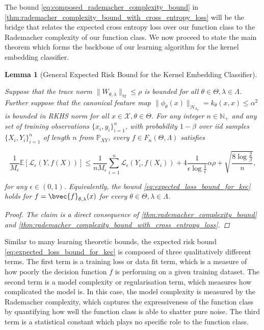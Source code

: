 \documentclass{article}
\newtheorem{lemma}[theorem]{Lemma}
\begin{document}
		The bound \eqref{eq:composed_rademacher_complexity_bound} in \cref{thm:rademacher_complexity_bound_with_cross_entropy_loss} will be the bridge that relates the expected cross entropy loss over our function class to the Rademacher complexity of our function class. We now proceed to state the main theorem which forms the backbone of our learning algorithm for the kernel embedding classifier.
		
		\begin{lemma}[General Expected Risk Bound for the Kernel Embedding Classifier]
			\label{thm:expected_loss_bound_for_kec}
			
			Suppose that the trace norm $\| W_{\theta, \lambda} \|_{\mathrm{tr}} \leq \rho$ is bounded for all $\theta \in \Theta, \lambda \in \Lambda$. Further suppose that the canonical feature map $\| \phi_{\theta}(x) \|_{\mathcal{H}_{k_{\theta}}} = k_{\theta}(x, x) \leq \alpha^{2}$ is bounded in RKHS norm for all $x \in \mathcal{X}, \theta \in \Theta$. For any integer $n \in \mathbb{N}_{+}$ and any set of training observations $\{x_{i}, y_{i}\}_{i = 1}^{n}$, with probability $1 - \beta$ over \textit{iid} samples $\{X_{i}, Y_{i}\}_{i = 1}^{n}$ of length $n$ from $\mathbb{P}_{X Y}$, every $f \in F_{n}(\Theta, \Lambda)$ satisfies
			
			\begin{equation}
				\frac{1}{M_{\epsilon}} \mathbb{E}[\mathcal{L}_{\epsilon}(Y, f(X))] \leq \frac{1}{n M_{\epsilon}} \sum_{i = 1}^{n} \mathcal{L}_{\epsilon}(Y_{i}, f(X_{i})) + 4 \frac{1}{\epsilon \log{\frac{1}{\epsilon}}} \alpha \rho + \sqrt{\frac{8 \log{\frac{2}{\beta}}}{n}},
			\label{eq:expected_loss_bound_for_kec}
			\end{equation}
			
			for any $\epsilon \in (0, 1)$. Equivalently, the bound \eqref{eq:expected_loss_bound_for_kec} holds for $f = \bvec{f}_{\theta, \lambda}(x)$ for every $\theta \in \Theta, \lambda \in \Lambda$.
	
			\begin{proof}
				The claim is a direct consequence of \cref{thm:rademacher_complexity_bound} and \cref{thm:rademacher_complexity_bound_with_cross_entropy_loss}.
			\end{proof}
		\end{lemma}

		Similar to many learning theoretic bounds, the expected risk bound \eqref{eq:expected_loss_bound_for_kec} is composed of three qualitatively different terms. The first term is a training loss or data fit term, which is a measure of how poorly the decision function $f$ is performing on a given training dataset. The second term is a model complexity or regularisation term, which measures how complicated the model is. In this case, the model complexity is measured by the Rademacher complexity, which captures the expressiveness of the function class by quantifying how well the function class is able to shatter pure noise. The third term is a statistical constant which plays no specific role to the function class.
		
\end{document}
